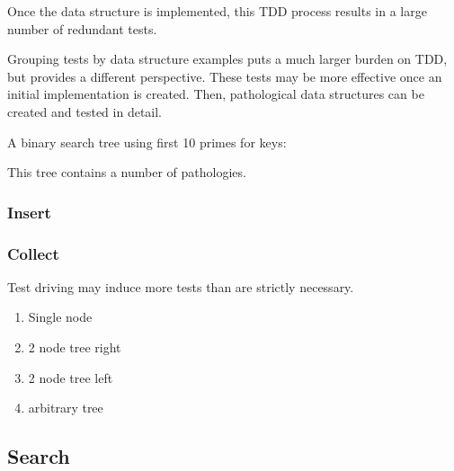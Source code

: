 \documentclass{article}
\begin{document}
Once the data structure is implemented, this TDD process results in a large number
of redundant tests.

Grouping tests by data structure examples puts a much larger burden on TDD,
but provides a different perspective. These tests may be more effective once an
initial implementation is created. Then, pathological data structures can be
created and tested in detail.


A binary search tree using first 10 primes for keys:


This tree contains a number of pathologies.

\subsubsection{Insert}



\subsubsection{Collect}

Test driving may induce more tests than are strictly necessary.

\begin{enumerate}
\item Single node
\item 2 node tree right
\item 2 node tree left
\item arbitrary tree
\end{enumerate}

\subsection{Search}
\end{document}
